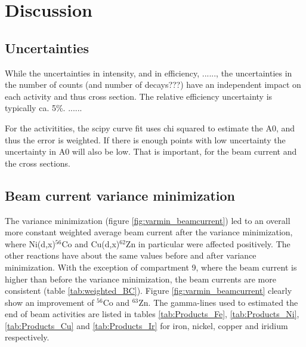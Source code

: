 \chapter{Discussion}



\section{Uncertainties}
While the uncertainties in intensity,  and in efficiency, ......, the uncertainties in the number of counts (and number of decays???) have an independent impact on each activity and thus cross section. 
The relative efficiency uncertainty is typically ca. 5\%. ......

For the activitities, the scipy curve fit uses chi squared to estimate the A0, and thus the error is weighted. If there is enough points with low uncertainty the uncertainty in A0 will also be low. That is important, for the beam current and the cross sections. 

\section{Beam current variance minimization}

The variance minimization (figure \ref{fig:varmin_beamcurrent}) led to an overall more constant weighted average beam current after the variance minimization, where Ni(d,x)$^{56}$Co and Cu(d,x)$^{62}$Zn in particular were affected positively. The other reactions have about the same values before and after variance minimization. With the exception of compartment 9, where the beam current is higher than before the variance minimization, the beam currents are more consistent (table \ref{tab:weighted_BC}). Figure \ref{fig:varmin_beamcurrent} clearly show an improvement of $^{56}$Co and $^{63}$Zn. The gamma-lines used to estimated the end of beam activities are listed in tables \ref{tab:Products_Fe}, \ref{tab:Products_Ni}, \ref{tab:Products_Cu} and \ref{tab:Products_Ir} for iron, nickel, copper and iridium respectively. \\ 

